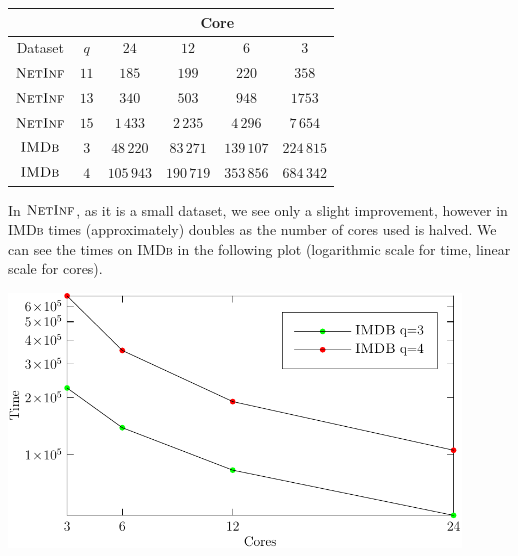 \begin{table}[h]
	\centering
	\begin{tabular}{|c|c|c|c|c|c|}
		\cline{3-6}
		\multicolumn{2}{c}{} & \multicolumn{4}{|c|}{ Core } \\ 
		\hline
		Dataset           & $q$  & $24$       & $12$       & $6$        & $3$        \\  \hline \hline
		$\textsc{NetInf}$ & $11$ & $185$      & $199$      & $220$      & $358$      \\  \hline
		$\textsc{NetInf}$ & $13$ & $340$      & $503$      & $948$      & $1753$     \\  \hline
		$\textsc{NetInf}$ & $15$ & $1\,433$   & $2\,235$   & $4\,296$   & $7\,654$   \\  \hline \hline
		$\textsc{IMDb}$   & $3$  & $48\,220$  & $83\,271$  & $139\,107$ & $224\,815$ \\  \hline
		$\textsc{IMDb}$   & $4$  & $105\,943$ & $190\,719$ & $353\,856$ & $684\,342$ \\  \hline
		
	\end{tabular}
\end{table}

In $\textsc{NetInf}$, as it is a small dataset, we see only a slight improvement, 
however in \textsc{IMDb} times (approximately) doubles as the number of cores used is halved.
We can see the times on \textsc{IMDb} in the following plot (logarithmic scale for time, linear scale for cores).\bigskip

\begin{minipage}[h]{0.9\textwidth}
 \centering
 \includegraphics[width=0.9\textwidth]{figure/figure-4-1}
\end{minipage}

\clearpage